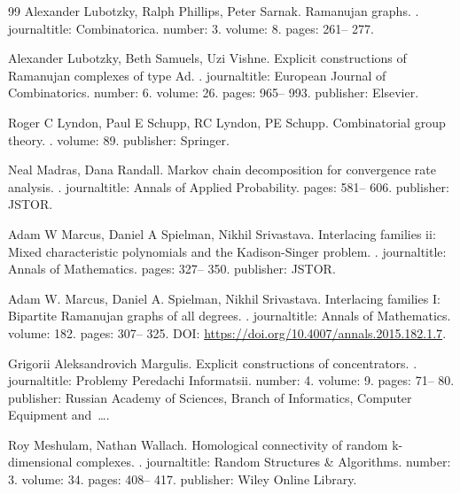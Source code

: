 \begin{thebibliography}{99}
Alexander Lubotzky, Ralph Phillips, Peter Sarnak.
\newblock Ramanujan graphs.
.
\newblock journaltitle: Combinatorica.
\newblock number: 3.
\newblock volume: 8.
\newblock pages: 261-- 277.

Alexander Lubotzky, Beth Samuels, Uzi Vishne.
\newblock Explicit constructions of Ramanujan complexes of type Ad.
.
\newblock journaltitle: European Journal of Combinatorics.
\newblock number: 6.
\newblock volume: 26.
\newblock pages: 965-- 993.
\newblock publisher: Elsevier.

Roger C Lyndon, Paul E Schupp, RC Lyndon, PE Schupp.
\newblock Combinatorial group theory.
.
\newblock volume: 89.
\newblock publisher: Springer.

Neal Madras, Dana Randall.
\newblock Markov chain decomposition for convergence rate analysis.
.
\newblock journaltitle: Annals of Applied Probability.
\newblock pages: 581-- 606.
\newblock publisher: JSTOR.

Adam W Marcus, Daniel A Spielman, Nikhil Srivastava.
\newblock Interlacing families ii: Mixed characteristic polynomials and the {K}adison-{S}inger problem.
.
\newblock journaltitle: Annals of Mathematics.
\newblock pages: 327-- 350.
\newblock publisher: JSTOR.

Adam W. Marcus, Daniel A. Spielman, Nikhil Srivastava.
\newblock Interlacing families I: Bipartite Ramanujan graphs of all degrees.
.
\newblock journaltitle: Annals of Mathematics.
\newblock volume: 182.
\newblock pages: 307-- 325.
\newblock DOI: \url{https://doi.org/10.4007/annals.2015.182.1.7}.

Grigorii Aleksandrovich Margulis.
\newblock Explicit constructions of concentrators.
.
\newblock journaltitle: Problemy Peredachi Informatsii.
\newblock number: 4.
\newblock volume: 9.
\newblock pages: 71-- 80.
\newblock publisher: Russian Academy of Sciences, Branch of Informatics, Computer Equipment and~….

Roy Meshulam, Nathan Wallach.
\newblock Homological connectivity of random k-dimensional complexes.
.
\newblock journaltitle: Random Structures \& Algorithms.
\newblock number: 3.
\newblock volume: 34.
\newblock pages: 408-- 417.
\newblock publisher: Wiley Online Library.


\end{thebibliography}
